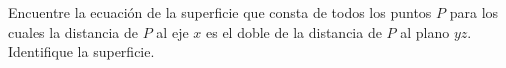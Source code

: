 \item Encuentre la ecuación de la superficie que consta de todos los puntos $P$ para los cuales la distancia de $P$ al eje $x$ es el doble de la distancia de $P$ al plano $yz$. Identifique la superficie.
